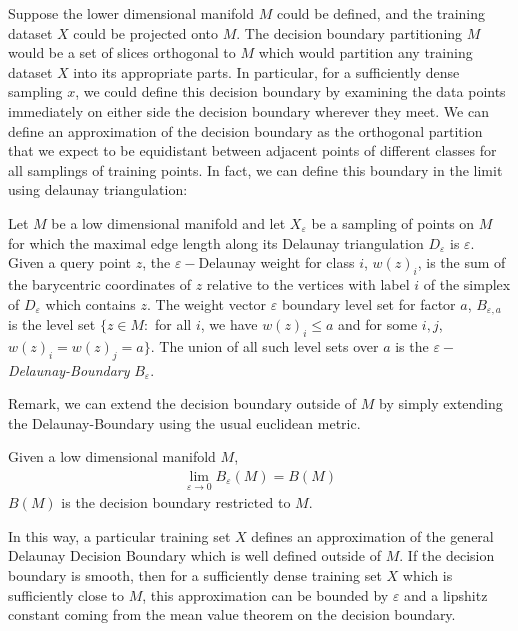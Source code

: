 Suppose the lower dimensional manifold $M$ could be defined, and the
training dataset $X$ could be projected onto $M$. The decision
boundary partitioning $M$ would be a set of slices orthogonal to $M$
which would partition any training dataset $X$ into its appropriate
parts. In particular, for a sufficiently dense sampling $x$, we could
define this decision boundary by examining the data points immediately
on either side the decision boundary wherever they meet. We can define
an approximation of the decision boundary as the orthogonal partition
that we expect to be equidistant between adjacent points of different
classes for all samplings of training points. %
In fact, we can define this boundary in the limit using delaunay
triangulation:
\begin{definition}
  Let $M$ be a low dimensional manifold and let $X_{\varepsilon}$ be a
  sampling of points on $M$ for which the maximal edge length along
  its Delaunay triangulation $D_{\varepsilon}$ is
  $\varepsilon$. Given a query point $z$, the $\varepsilon-$Delaunay
  weight for class $i$, $w(z)_i$, is the sum of the barycentric coordinates of $z$
  relative to the vertices with label $i$ of the simplex of $D_{\varepsilon}$ which
  contains $z$. The weight vector $\varepsilon$ boundary level set for
  factor $a$, $B_{\varepsilon,a}$ is the level set $\{z \in M :$ for
  all $i$, we have $w(z)_i \leq a$ and for some $i,j$, $w(z)_i =
  w(z)_j = a\}$. The union of all such level sets over $a$ is the
  \emph{$\varepsilon-$Delaunay-Boundary} $B_{\varepsilon}$. 
  \end{definition}

  Remark, we can extend the decision boundary outside of $M$ by simply
  extending the Delaunay-Boundary using the usual euclidean metric. 

  \begin{theorem}
    Given a low dimensional manifold $M$, 
    \begin{align}
      \lim_{\varepsilon \to 0} B_{\varepsilon}(M) = B(M)
    \end{align}
    $B(M)$ is the decision boundary restricted to $M$. 
  \end{theorem}
  
In this way, a particular training set $X$ defines an approximation of
the general Delaunay Decision Boundary which is well defined outside
of $M$. If the decision boundary is smooth, then for a sufficiently
dense training set $X$ which is sufficiently close to $M$, this
approximation can be bounded by $\varepsilon$ and a lipshitz constant
coming from the mean value theorem on the decision boundary.

